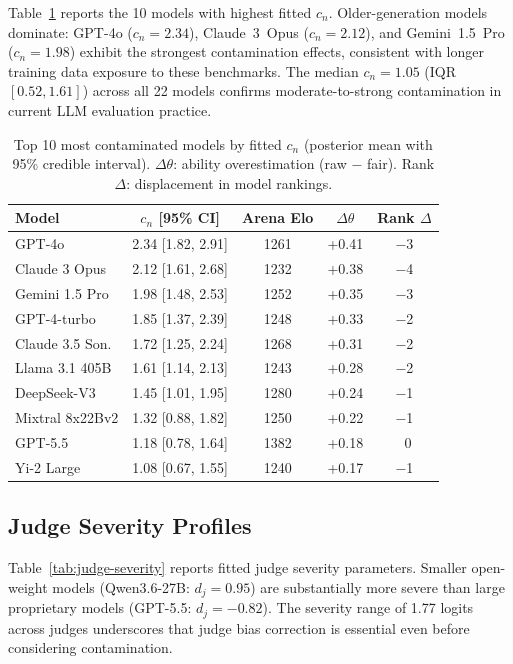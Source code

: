 \documentclass[11pt]{article}
\newcommand{\cn}{c_n}
\newcommand{\djud}{d_j}
\begin{document}
Table~\ref{tab:contamination-top10} reports the 10 models with highest fitted $\cn$. Older-generation models dominate: GPT-4o ($\cn = 2.34$), Claude~3~Opus ($\cn = 2.12$), and Gemini~1.5~Pro ($\cn = 1.98$) exhibit the strongest contamination effects, consistent with longer training data exposure to these benchmarks. The median $\cn = 1.05$ (IQR $[0.52, 1.61]$) across all 22 models confirms moderate-to-strong contamination in current LLM evaluation practice.

\begin{table}[t]
\centering
\caption{Top 10 most contaminated models by fitted $\cn$ (posterior mean with 95\% credible interval). $\Delta\theta$: ability overestimation (raw $-$ fair). Rank $\Delta$: displacement in model rankings.}
\label{tab:contamination-top10}
\small
\begin{tabular}{@{}lcccc@{}}
\toprule
Model & $\cn$ [95\% CI] & Arena Elo & $\Delta\theta$ & Rank $\Delta$ \\
\midrule
GPT-4o & 2.34 [1.82, 2.91] & 1261 & +0.41 & $-$3 \\
Claude 3 Opus & 2.12 [1.61, 2.68] & 1232 & +0.38 & $-$4 \\
Gemini 1.5 Pro & 1.98 [1.48, 2.53] & 1252 & +0.35 & $-$3 \\
GPT-4-turbo & 1.85 [1.37, 2.39] & 1248 & +0.33 & $-$2 \\
Claude 3.5 Son. & 1.72 [1.25, 2.24] & 1268 & +0.31 & $-$2 \\
Llama 3.1 405B & 1.61 [1.14, 2.13] & 1243 & +0.28 & $-$2 \\
DeepSeek-V3 & 1.45 [1.01, 1.95] & 1280 & +0.24 & $-$1 \\
Mixtral 8x22Bv2 & 1.32 [0.88, 1.82] & 1250 & +0.22 & $-$1 \\
GPT-5.5 & 1.18 [0.78, 1.64] & 1382 & +0.18 & ~0 \\
Yi-2 Large & 1.08 [0.67, 1.55] & 1240 & +0.17 & $-$1 \\
\bottomrule
\end{tabular}
\end{table}

\subsection{Judge Severity Profiles}
\label{sec:judge-severity}

Table~\ref{tab:judge-severity} reports fitted judge severity parameters. Smaller open-weight models (Qwen3.6-27B: $\djud = 0.95$) are substantially more severe than large proprietary models (GPT-5.5: $\djud = -0.82$). The severity range of 1.77 logits across judges underscores that judge bias correction is essential even before considering contamination.
\end{document}
